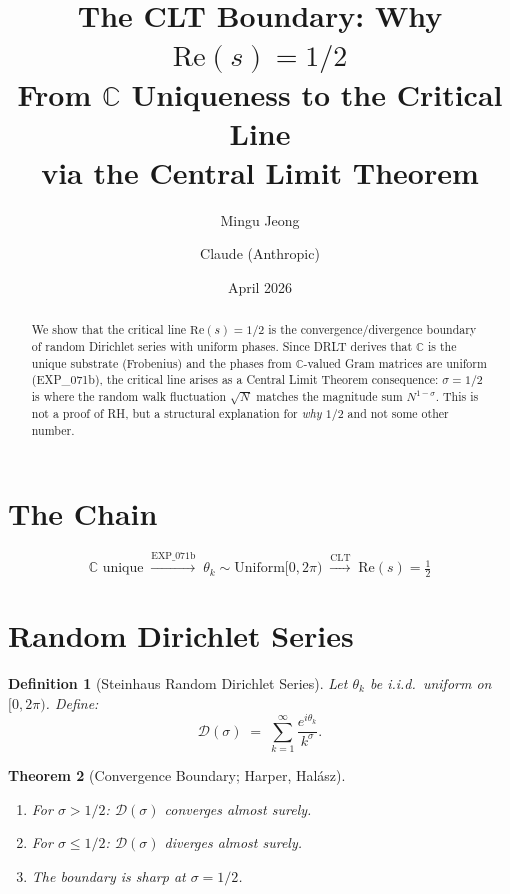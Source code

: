 \documentclass[11pt]{article}
\title{The CLT Boundary: Why $\mathrm{Re}(s) = 1/2$\\[6pt]
  {\large From $\mathbb{C}$ Uniqueness to the Critical Line\\
  via the Central Limit Theorem}}
\author{Mingu Jeong \and Claude (Anthropic)}
\date{April 2026}
\newtheorem{theorem}{Theorem}
\newtheorem{definition}[theorem]{Definition}
\begin{document}
\maketitle

\begin{abstract}
We show that the critical line $\mathrm{Re}(s) = 1/2$ is the
convergence/divergence boundary of random Dirichlet series with
uniform phases.  Since DRLT derives that $\mathbb{C}$ is the unique
substrate (Frobenius) and the phases from $\mathbb{C}$-valued Gram
matrices are uniform (EXP\_071b), the critical line arises as a
Central Limit Theorem consequence: $\sigma = 1/2$ is where the
random walk fluctuation $\sqrt{N}$ matches the magnitude sum
$N^{1-\sigma}$.  This is not a proof of RH, but a structural
explanation for \emph{why $1/2$} and not some other number.
\end{abstract}

\section{The Chain}

\[
  \boxed{\mathbb{C} \text{ unique}}
  \;\xrightarrow{\text{EXP\_071b}}\;
  \boxed{\theta_k \sim \mathrm{Uniform}[0, 2\pi)}
  \;\xrightarrow{\text{CLT}}\;
  \boxed{\mathrm{Re}(s) = \tfrac{1}{2}}
\]

\section{Random Dirichlet Series}

\begin{definition}[Steinhaus Random Dirichlet Series]
Let $\theta_k$ be i.i.d.\ uniform on $[0, 2\pi)$.  Define:
\[
  \mathcal{D}(\sigma) \;=\; \sum_{k=1}^{\infty}
  \frac{e^{i\theta_k}}{k^{\sigma}}.
\]
\end{definition}

\begin{theorem}[Convergence Boundary; Harper, Halász]
\label{thm:boundary}
\begin{enumerate}
  \item[(i)] For $\sigma > 1/2$: $\mathcal{D}(\sigma)$ converges
    almost surely.
  \item[(ii)] For $\sigma \leq 1/2$: $\mathcal{D}(\sigma)$ diverges
    almost surely.
  \item[(iii)] The boundary is \emph{sharp} at $\sigma = 1/2$.
\end{enumerate}
\end{theorem}
\end{document}
